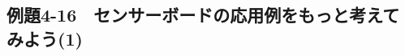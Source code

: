 \newpage
\subsection{例題4-16　センサーボードの応用例をもっと考えてみよう(1)}

\begin{description}
    \item {}
\end{description}

